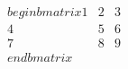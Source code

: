 \documentclass[preview]{standalone}
\begin{document}
\begin{align*}
\quad\\begin{bmatrix} 1 & 2 & 3 \quad\\ 4 & 5 & 6 \quad\\ 7 & 8 & 9 \quad\\end{bmatrix}
\end{align*}
\end{document}
